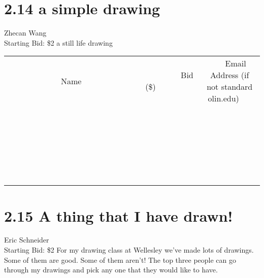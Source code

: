 \documentclass[11pt]{article}
\begin{document}
\section*{2.14 a simple drawing}
Zhecan Wang
\\
Starting Bid: \$2
\newline
a still life drawing
\\[6ex]
\begin{tabular}{c c c}
~~~~~~~~~~~~~Name~~~~~~~~~~~~~ & ~~~~~~~~~Bid (\$)~~~~~~~~~  & ~~~Email Address (if not standard olin.edu)~~~\\
 & & \\
\hline
 & & \\
\hline
 & & \\
\hline
 & & \\
\hline
 & & \\
\hline
 & & \\
\hline
 & & \\
\hline
 & & \\
\hline
 & & \\
\hline
 & & \\
\hline
 & & \\
\hline
 & & \\
\hline
 & & \\
\hline
 & & \\
\hline
 & & \\
\hline
 & & \\
\hline
 & & \\
\hline
 & & \\
\hline
 & & \\
\hline
 & & \\
\hline
 & & \\
\hline
 & & \\
\hline
 & & \\
\hline
 & & \\
\hline
 & & \\
\hline
 & & \\
\hline
\end{tabular}
\newpage
\section*{2.15 A thing that I have drawn!}
Eric Schneider
\\
Starting Bid: \$2
\newline
For my drawing class at Wellesley we've made lots of drawings. Some of them are good. Some of them aren't! The top three people can go through my drawings and pick any one that they would like to have.
\end{document}
